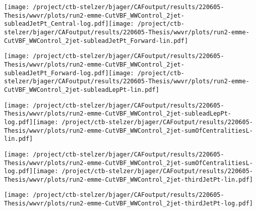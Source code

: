 \documentclass{article}
\begin{document}
\texttt{[image: /project/ctb-stelzer/bjager/CAFoutput/results/220605-Thesis/wwvr/plots/run2-emme-CutVBF\_WWControl\_2jet-subleadJetPt\_Central-log.pdf]}\texttt{[image: /project/ctb-stelzer/bjager/CAFoutput/results/220605-Thesis/wwvr/plots/run2-emme-CutVBF\_WWControl\_2jet-subleadJetPt\_Forward-lin.pdf]}

\texttt{[image: /project/ctb-stelzer/bjager/CAFoutput/results/220605-Thesis/wwvr/plots/run2-emme-CutVBF\_WWControl\_2jet-subleadJetPt\_Forward-log.pdf]}\texttt{[image: /project/ctb-stelzer/bjager/CAFoutput/results/220605-Thesis/wwvr/plots/run2-emme-CutVBF\_WWControl\_2jet-subleadLepPt-lin.pdf]}

\texttt{[image: /project/ctb-stelzer/bjager/CAFoutput/results/220605-Thesis/wwvr/plots/run2-emme-CutVBF\_WWControl\_2jet-subleadLepPt-log.pdf]}\texttt{[image: /project/ctb-stelzer/bjager/CAFoutput/results/220605-Thesis/wwvr/plots/run2-emme-CutVBF\_WWControl\_2jet-sumOfCentralitiesL-lin.pdf]}

\texttt{[image: /project/ctb-stelzer/bjager/CAFoutput/results/220605-Thesis/wwvr/plots/run2-emme-CutVBF\_WWControl\_2jet-sumOfCentralitiesL-log.pdf]}\texttt{[image: /project/ctb-stelzer/bjager/CAFoutput/results/220605-Thesis/wwvr/plots/run2-emme-CutVBF\_WWControl\_2jet-thirdJetPt-lin.pdf]}

\texttt{[image: /project/ctb-stelzer/bjager/CAFoutput/results/220605-Thesis/wwvr/plots/run2-emme-CutVBF\_WWControl\_2jet-thirdJetPt-log.pdf]}
\end{document}
